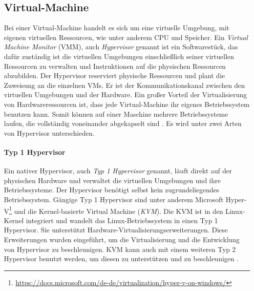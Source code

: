 \subsection{Virtual-Machine}
Bei einer Virtual-Machine handelt es sich um eine virtuelle Umgebung, mit 
eigenen virtuellen Ressourcen, wie unter anderem CPU und Speicher.
Ein \emph{Virtual Machine Monitor} (VMM), auch \emph{Hypervisor} genannt
ist ein Softwarestück, das dafür zuständig ist die 
virtuellen Umgebungen einschließlich seiner virtuellen Ressourcen zu verwalten
und Instruktionen auf die physischen Ressourcen abzubilden.
Der Hypervisor reserviert physische Ressourcen und plant die Zuweisung
an die einzelnen VMs. Er ist der Kommunikationskanal 
zwischen den virtuellen Umgebungen und der Hardware.
Ein großer Vorteil der Virtualisierung von Hardwareressourcen
ist, dass jede Virtual-Machine ihr eigenes Betriebssystem
benutzen kann. Somit können auf einer Maschine
mehrere Betriebssysteme laufen, die vollständig voneinander abgekapselt sind
\cite{RedHatVM} \cite{RedHatHypervisor}. Es wird unter zwei
Arten von Hypervisor unterschieden.

\paragraph{Typ 1 Hypervisor} Ein nativer Hypervisor, auch
\emph{Typ 1 Hypervisor} genannt, läuft direkt auf der physischen
Hardware und verwaltet die virtuellen Umgebungen und ihre Betriebssysteme.
Der Hypervisor benötigt selbst kein zugrundeliegendes Betriebssystem.
Gängige Typ 1 Hypervisor sind unter anderem Microsoft Hyper-V\footnote{\url{https://docs.microsoft.com/de-de/virtualization/hyper-v-on-windows/}}
\cite{RedHatHypervisor} und die Kernel-basierte Virtual
Machine (\emph{KVM}). Die KVM ist in den Linux-Kernel integriert und wandelt
das Linux-Betriebssystem in einen Typ 1 Hypervisor. Sie unterstützt
Hardware-Virtualisierungserweiterungen. Diese Erweiterungen wurden eingeführt,
um die Virtualisierung und die Entwicklung von Hypervisor
zu beschleunigen. KVM kann auch mit einem weiteren
Typ 2 Hypervisor benutzt werden, um diesen zu unterstützen und
zu beschleunigen \cite{IBMHypervisor} \cite{RedHatKVM}.

